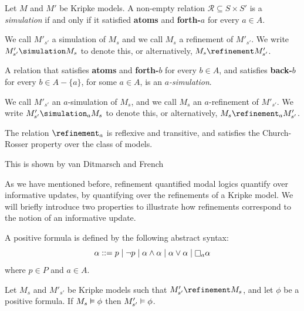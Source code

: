 \begin{definition}
Let $M$ and $M'$ be Kripke models. A non-empty relation $\mathcal{R}
\subseteq S \times S'$ is a \textit{simulation} if and only if it satisfied {\bf
atoms} and {\bf forth-$a$} for every $a \in A$.

We call $M'_{s'}$ a simulation of $M_s$ and we call $M_s$ a refinement of
$M'_{s'}$. We write $M'_{s'} \simulation M_s$ to denote this, or alternatively,
$M_s \refinement M'_{s'}$.

A relation that satisfies {\bf atoms} and {\bf forth-$b$} for every $b \in A$,
and satisfies {\bf back-$b$} for every $b \in A - \{a\}$, for some $a \in A$, is
an $a$\textit{-simulation}. 

We call $M'_{s'}$ an $a$-simulation of $M_s$, and we call $M_s$ an
$a$-refinement of $M'_{s'}$. We write $M'_{s'} \simulation_a M_s$ to denote
this, or alternatively, $M_s \refinement_a M'_{s'}$.
\end{definition}

\begin{lemma}\label{semantics-preorder}
The relation $\refinement_a$ is reflexive and transitive, and satisfies the
Church-Rosser property over the class of \classK{} models.
\end{lemma}

This is shown by van Ditmarsch and French~\cite{french2009simulation}

As we have mentioned before, refinement quantified modal logics quantify over
informative updates, by quantifying over the refinements of a Kripke model. We
will briefly introduce two properties to illustrate how refinements correspond
to the notion of an informative update.

\begin{definition}
A positive formula is defined by the following abstract syntax:
$$
\alpha ::=    p \bnfalt 
            \neg p \bnfalt
            \alpha \land \alpha \bnfalt
            \alpha \lor \alpha \bnfalt
            \knows_a \alpha
$$
where $p \in P$ and $a \in A$.
\end{definition}

\begin{proposition}\label{pre-positive}
Let $M_s$ and $M'_{s'}$ be Kripke models such that $M'_{s'} \refinement M_s$,
and let $\phi$ be a positive formula. If $M_s \vDash \phi$ then $M'_{s'}
\vDash \phi$. 
\end{proposition}

